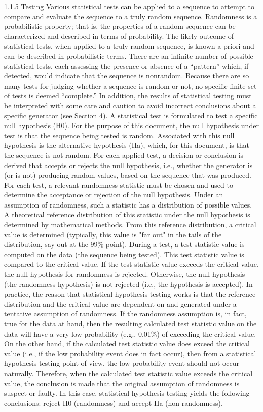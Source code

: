 1.1.5 Testing
Various statistical tests can be applied to a sequence to attempt to compare and evaluate the sequence to a truly random sequence. Randomness is a probabilistic property; that is, the properties of a random sequence can be characterized and described in terms of probability. The likely outcome of statistical tests, when applied to a truly random sequence, is known a priori and can be described in probabilistic terms. There are an infinite number of possible statistical tests, each assessing the presence or absence of a “pattern” which, if detected, would indicate that the sequence is nonrandom. Because there are so many tests for judging whether a sequence is random or not, no specific finite set of tests is deemed “complete.” In addition, the results of statistical testing must be interpreted with some care and caution to avoid incorrect conclusions about a specific generator (see Section 4). A statistical test is formulated to test a specific null hypothesis (H0). For the purpose of this document, the null hypothesis under test is that the sequence being tested is random. Associated with this null hypothesis is the alternative hypothesis (Ha), which, for this document, is that the sequence is not random. For each applied test, a decision or conclusion is derived that accepts or rejects the null hypothesis, i.e., whether the generator is (or is not) producing random values, based on the sequence that was produced. For each test, a relevant randomness statistic must be chosen and used to determine the acceptance or rejection of the null hypothesis. Under an assumption of randomness, such a statistic has a distribution of possible values. A theoretical reference distribution of this statistic under the null hypothesis is determined by mathematical methods. From this reference distribution, a critical value is determined (typically, this value is "far out" in the tails of the distribution, say out at the 99\% point). During a test, a test statistic value is computed on the data (the sequence being tested). This test statistic value is compared to the critical value. If the test statistic value exceeds the critical value, the null hypothesis for randomness is rejected. Otherwise, the null hypothesis (the randomness hypothesis) is not rejected (i.e., the hypothesis is accepted). In practice, the reason that statistical hypothesis testing works is that the reference distribution and the critical value are dependent on and generated under a tentative assumption of randomness. If the randomness assumption is, in fact, true for the data at hand, then the resulting calculated test statistic value on the data will have a very low probability (e.g., 0.01\%) of exceeding the critical value. On the other hand, if the calculated test statistic value does exceed the critical value (i.e., if the low probability event does in fact occur), then from a statistical hypothesis testing point of view, the low probability event should not occur naturally. Therefore, when the calculated test statistic value exceeds the critical value, the conclusion is made that the original assumption of randomness is suspect or faulty. In this case, statistical hypothesis testing yields the following conclusions: reject H0 (randomness) and accept Ha (non-randomness). 

